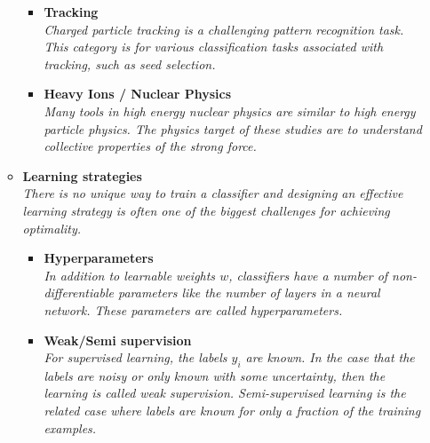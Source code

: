 \documentclass[12pt,letterpaper]{article}
\begin{document}
\begin{itemize}
\begin{itemize}
\begin{itemize}
			\item \textbf{Tracking}~\cite{Farrell:DLPS2017,Farrell:2018cjr,Amrouche:2019wmx,Ju:2020xty,Akar:2020jti,Shlomi:2020ufi,Choma:2020cry,Siviero:2020tim,Fox:2020hfm,Amrouche:2021tlm,goto2021development,Biscarat:2021dlj,Akar:2021gns,Thais:2021qcb,Ju:2021ayy,Dezoort:2021kfk,Edmonds:2021lzd,Lavrik:2021zgt,Huth:2021zcm,Goncharov:2021wvd}
			\\\textit{Charged particle tracking is a challenging pattern recognition task.  This category is for various classification tasks associated with tracking, such as seed selection.}
			\item \textbf{Heavy Ions / Nuclear Physics}~\cite{Pang:2016vdc,Chien:2018dfn,Du:2020pmp,Du:2019civ,Mallick:2021wop,Nagu:2021zho,Zhao:2021yjo,Sombillo:2021ifs,Zhou:2021bvw,Apolinario:2021olp,Brown:2021upr,Du:2021pqa,Kuttan:2021npg,Huang:2021iux,Shokr:2021ouh,He:2021uko,Habashy:2021orz,Zepeda:2021tzp,Mishra:2021eqb}
			\\\textit{Many tools in high energy nuclear physics are similar to high energy particle physics.  The physics target of these studies are to understand collective properties of the strong force.}
		\end{itemize}
		\item \textbf{Learning strategies}
		\\\textit{There is no unique way to train a classifier and designing an effective learning strategy is often one of the biggest challenges for achieving optimality.}
			\begin{itemize}
				\item \textbf{Hyperparameters}~\cite{Tani:2020dyi,Dudko:2021cie}
				\\\textit{In addition to learnable weights $w$, classifiers have a number of non-differentiable parameters like the number of layers in a neural network.  These parameters are called hyperparameters.}
				\item \textbf{Weak/Semi supervision}~\cite{Dery:2017fap,Metodiev:2017vrx,Komiske:2018oaa,Collins:2018epr,Collins:2019jip,Borisyak:2019vbz,Cohen:2017exh,Komiske:2018vkc,Metodiev:2018ftz,collaboration2020dijet,Amram:2020ykb,Brewer:2020och,Dahbi:2020zjw,Lee:2019ssx,Lieberman:2021krq}
				\\\textit{For supervised learning, the labels $y_i$ are known.  In the case that the labels are noisy or only known with some uncertainty, then the learning is called weak supervision.  Semi-supervised learning is the related case where labels are known for only a fraction of the training examples.}

\end{itemize}
\end{itemize}
\end{itemize}
\end{document}
